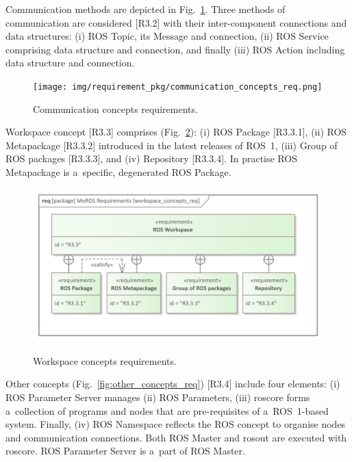 \documentclass[11pt,oneside,a4paper]{report}
\begin{document}
	\pagebreak
	
	Communication methods are depicted in Fig.~\ref{fig:communication_concepts_req}.
	 Three methods of communication are considered [R3.2] with their inter-component connections and data structures: (i) ROS Topic, its Message and connection, (ii) ROS Service comprising data structure and connection, and finally (iii) ROS Action including data structure and connection.
	
	\begin{figure}[H]
		\centering
		\begin{center}
			{\texttt{[image: img/requirement\_pkg/communication\_concepts\_req.png]}}
		\end{center}
		\caption{Communication concepts requirements.} 
		\label{fig:communication_concepts_req}
	\end{figure}
	
	Workspace concept [R3.3] comprises (Fig.~\ref{fig:workspace_concepts_req}): (i) ROS Package [R3.3.1], (ii) ROS Metapackage [R3.3.2] introduced in the latest releases of ROS~1, (iii) Group of ROS packages [R3.3.3], and (iv) Repository [R3.3.4]. In practise ROS Metapackage is a~specific, degenerated ROS Package.
	
	\begin{figure}[H]
		\centering
		\begin{center}
			{\includegraphics[scale=1.1]{img/requirement_pkg/workspace_concepts_req.png}}
		\end{center}
		\caption{Workspace concepts requirements.} 
		\label{fig:workspace_concepts_req}
	\end{figure}
	
	Other concepts (Fig.~\ref{fig:other_concepts_req}) [R3.4] include four elements: (i) ROS Parameter Server manages (ii) ROS Parameters, (iii) roscore forms a~collection of programs and nodes that are pre-requisites of a~ROS~1-based system. Finally, (iv) ROS Namespace reflects the ROS concept to organise nodes and communication connections. Both ROS Master and rosout are executed with roscore. ROS Parameter Server is a~part of ROS Master.
	
\end{document}
